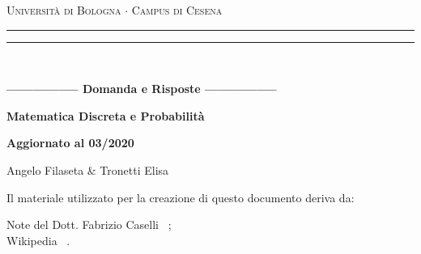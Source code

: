 \begin{titlepage}
    \begin{center}
        {{\Large{\textsc{Università di Bologna $\cdot$ Campus di Cesena}}}}
        \rule[0.1cm]{15.8cm}{0.1mm}
        \rule[0.5cm]{15.8cm}{0.6mm}
        \\
        \vspace{3mm}
    \end{center}
    \vspace{2mm}
    \begin{center}
        {\LARGE{\bf{----------------- Domanda e Risposte -----------------}}}
        \vspace{5mm} \par \noindent
        {\Huge{\bf{Matematica Discreta e Probabilità}}}
        \vspace{10mm} \par \noindent
        {\LARGE \textbf{Aggiornato al 03/2020}}
        \vspace{15mm} \par \noindent
        {\Large Angelo Filaseta \& Tronetti Elisa}
        \vspace{20mm} \par \noindent
        {\LARGE Il materiale utilizzato per la creazione di questo documento deriva da:\\}
        \vspace{3mm} \par \noindent
        {\Large Note del Dott. Fabrizio Caselli ~\cite{Fabrizio44:online};\\
        Wikipedia ~\cite{Wikipedi57:online}.\\}
    \end{center}
    \hfill
    \vspace{40mm}
\end{titlepage}
